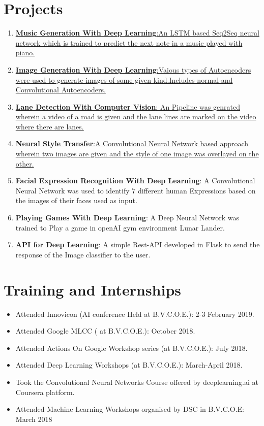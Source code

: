 \documentclass{my_cv}
\begin{document}
	\section{\colorbox{mycolor}{\textcolor{golde}{Projects}}}
	  \begin{enumerate}
	  	\item \href{https://github.com/anuj2110/lstm-music-gen}{\textbf{Music Generation With Deep Learning}:An LSTM based Seq2Seq neural network which is trained to predict the next note in a music played with piano.}
	  	
	  	\item \href{https://github.com/anuj2110/keras}{\textbf{Image Generation With Deep Learning}:Vaious types of Autoencoders were used to generate images of some given kind.Includes normal and Convolutional Autoencoders.}
	  	\item \href{https://github.com/anuj2110/LaneDetection}{ \textbf{Lane Detection With Computer Vision}:
	  		An Pipeline was genrated wherein a video of a road is given and the lane lines are marked on the video where there are lanes.}
	  	\item \href{https://github.com/anuj2110/neural-style-transfer}{\textbf{Neural Style Transfer}:A Convolutional Neural Network based approach wherein two images are given and the style of one image was overlayed on the other.}
	  	\item \textbf{Facial Expression Recognition With Deep Learning}:
	  	A Convolutional Neural Network was used to identify 7 different human Expressions based on the images of their faces used as input.
	  	\item \textbf{Playing Games With Deep Learning}: A Deep Neural Network was trained to Play a game in openAI gym environment Lunar Lander.
	  	\item \textbf{API for Deep Learning}: A simple Rest-API developed in Flask to send the response of the Image classifier to the user.
	  \end{enumerate}
	\section{\colorbox{mycolor}{\textcolor{golde}{Training and Internships}}}
		\begin{itemize}
			\item Attended Innovicon (AI conference Held at B.V.C.O.E.): 2-3 February 2019.
			\item Attended Google MLCC ( at B.V.C.O.E.): October 2018.
			\item Attended Actions On Google Workshop series (at B.V.C.O.E.): July 2018.
			\item Attended Deep Learning Workshops (at B.V.C.O.E.): March-April 2018.
			\item Took the Convolutional Neural Networks Course offered by deeplearning.ai at Coursera platform.
			\item Attended Machine Learning Workshops organised by DSC in B.V.C.O.E: March 2018
			 
		\end{itemize}
\end{document}
